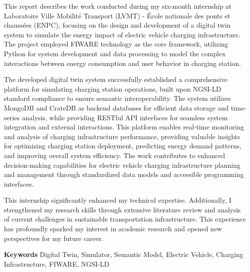 \documentclass[11pt]{memoir}
\begin{document}
This report describes the work conducted during my six-month internship at Laboratoire Ville Mobilité Transport (LVMT) - École nationale des ponts et chaussées (ENPC), focusing on the design and development of a digital twin system to simulate the energy impact of electric vehicle charging infrastructure. The project employed FIWARE technology as the core framework, utilizing Python for system development and data processing to model the complex interactions between energy consumption and user behavior in charging station.

The developed digital twin system successfully established a comprehensive platform for simulating charging station operations, built upon NGSI-LD standard compliance to ensure semantic interoperability. The system utilizes MongoDB and CrateDB as backend databases for efficient data storage and time-series analysis, while providing RESTful API interfaces for seamless system integration and external interactions. This platform enables real-time monitoring and analysis of charging infrastructure performance, providing valuable insights for optimizing charging station deployment, predicting energy demand patterns, and improving overall system efficiency. The work contributes to enhanced decision-making capabilities for electric vehicle charging infrastructure planning and management through standardized data models and accessible programming interfaces.

This internship significantly enhanced my technical expertise. Additionally, I strengthened my research skills through extensive literature review and analysis of current challenges in sustainable transportation infrastructure. This experience has profoundly sparked my interest in academic research and opened new perspectives for my future career.

\bigskip\bigskip

\textbf{\color{CentraleBlue}Keywords} Digital Twin, Simulator, Semantic Model, Electric Vehicle, Charging Infrastructure, FIWARE, NGSI-LD

\newpage

\restoregeometry 

\tableofcontents









\printglossaries


\appendix






 

\end{document}
